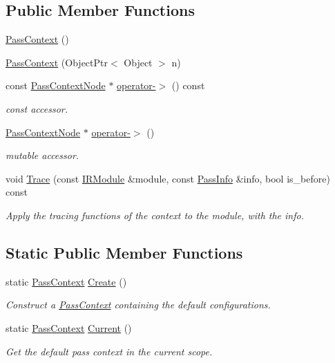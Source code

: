 \subsection*{Public Member Functions}
\begin{DoxyCompactItemize}
\item 
\hyperlink{classtvm_1_1transform_1_1PassContext_a906dadb55586afece28d71d3436fdf1d}{Pass\+Context} ()
\item 
\hyperlink{classtvm_1_1transform_1_1PassContext_a8f5f511c2e29991eceff7b1f4883313e}{Pass\+Context} (Object\+Ptr$<$ Object $>$ n)
\item 
const \hyperlink{classtvm_1_1transform_1_1PassContextNode}{Pass\+Context\+Node} $\ast$ \hyperlink{classtvm_1_1transform_1_1PassContext_a69b8a7115988b2e8a77afc8e8f98aaa3}{operator-\/$>$} () const 
\begin{DoxyCompactList}\small\item\em const accessor. \end{DoxyCompactList}\item 
\hyperlink{classtvm_1_1transform_1_1PassContextNode}{Pass\+Context\+Node} $\ast$ \hyperlink{classtvm_1_1transform_1_1PassContext_ab10baf6f7bcbd6e0e4b295399bc9f3a9}{operator-\/$>$} ()
\begin{DoxyCompactList}\small\item\em mutable accessor. \end{DoxyCompactList}\item 
void \hyperlink{classtvm_1_1transform_1_1PassContext_a4cddf63528edf5b0554a13a1faa96f3f}{Trace} (const \hyperlink{classtvm_1_1IRModule}{I\+R\+Module} \&module, const \hyperlink{classtvm_1_1transform_1_1PassInfo}{Pass\+Info} \&info, bool is\+\_\+before) const 
\begin{DoxyCompactList}\small\item\em Apply the tracing functions of the context to the module, with the info. \end{DoxyCompactList}\end{DoxyCompactItemize}
\subsection*{Static Public Member Functions}
\begin{DoxyCompactItemize}
\item 
static \hyperlink{classtvm_1_1transform_1_1PassContext}{Pass\+Context} \hyperlink{classtvm_1_1transform_1_1PassContext_aabfad8965c2f4e7b6e4b0812652ddfd2}{Create} ()
\begin{DoxyCompactList}\small\item\em Construct a \hyperlink{classtvm_1_1transform_1_1PassContext}{Pass\+Context} containing the default configurations. \end{DoxyCompactList}\item 
static \hyperlink{classtvm_1_1transform_1_1PassContext}{Pass\+Context} \hyperlink{classtvm_1_1transform_1_1PassContext_a4d21045965f6e5ea9338a1e8111af5fc}{Current} ()
\begin{DoxyCompactList}\small\item\em Get the default pass context in the current scope. \end{DoxyCompactList}\end{DoxyCompactItemize}
